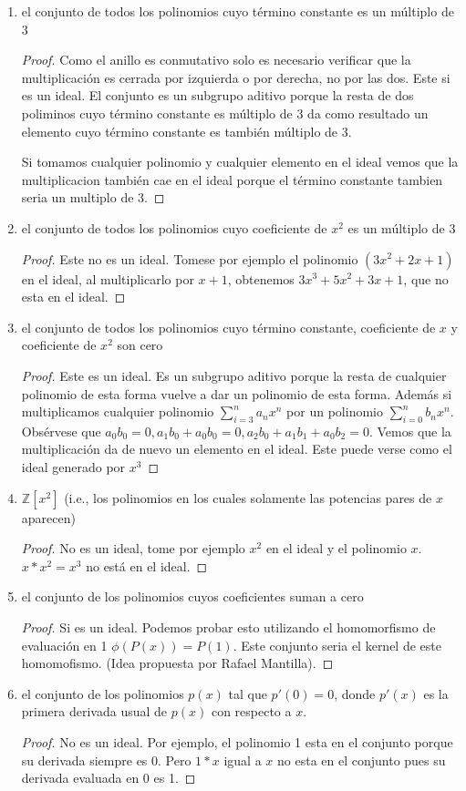 \documentclass[letter,twoside,12pt]{article}
\begin{document}
\begin{enumerate}[label=\textbf{(\alph*)}]
\item el conjunto de todos los polinomios cuyo t\'ermino constante es un m\'ultiplo de 3
\begin{proof}
Como el anillo es conmutativo solo es necesario verificar que la multiplicaci\'on es cerrada por izquierda o por derecha, no por las dos.
Este si es un ideal. El conjunto es un subgrupo aditivo porque la resta de dos poliminos cuyo t\'ermino constante es m\'ultiplo de 3 da como resultado un elemento cuyo t\'ermino constante es tambi\'en m\'ultiplo de 3.

Si tomamos cualquier polinomio y cualquier elemento en el ideal vemos que la multiplicacion tambi\'en cae en el ideal porque el t\'ermino constante tambien seria un multiplo de 3.
\end{proof}
\item el conjunto de todos los polinomios cuyo coeficiente de $x^2$ es un m\'ultiplo de 3
\begin{proof}
Este no es un ideal. Tomese por ejemplo el polinomio $(3x^2+2x+1)$ en el ideal, al multiplicarlo por $x+1$, obtenemos $3x^3+5x^2+3x+1$, que no esta en el ideal.
\end{proof}
\item el conjunto de todos los polinomios cuyo t\'ermino constante, coeficiente de $x$ y coeficiente de $x^2$ son cero
\begin{proof}
Este es un ideal. Es un subgrupo aditivo porque la resta de cualquier polinomio de esta forma vuelve a dar un polinomio de esta forma. Adem\'as si multiplicamos cualquier polinomio $\sum_{i=3}^n a_nx^n$ por un polinomio $\sum_{i=0}^n b_nx^n$. Obs\'ervese que $a_0b_0=0, a_1b_0+a_0b_0=0, a_2b_0+a_1b_1+a_0b_2=0$.
Vemos que la multiplicaci\'on da de nuevo un elemento en el ideal. Este puede verse como el ideal generado por $x^3$
\end{proof}
\item $\mathbb{Z}[x^2]$ (i.e., los polinomios en los cuales solamente las potencias pares de $x$ aparecen)
\begin{proof}
No es un ideal, tome por ejemplo $x^2$ en el ideal y el polinomio $x$. $x*x^2=x^3$ no est\'a en el ideal.
\end{proof}
\item el conjunto de los polinomios cuyos coeficientes suman a cero
\begin{proof}
Si es un ideal. Podemos probar esto utilizando el homomorfismo de evaluaci\'on en 1 $\phi(P(x))=P(1)$. Este conjunto seria el kernel de este homomofismo. (Idea propuesta por Rafael Mantilla).
\end{proof}
\item el conjunto de los polinomios $p(x)$ tal que $p'(0)=0$, donde $p'(x)$ es la primera derivada usual de $p(x)$ con respecto a $x$.
\begin{proof}
No es un ideal. Por ejemplo, el polinomio 1 esta en el conjunto porque su derivada siempre es 0. Pero $1*x$ igual a $x$ no esta en el conjunto pues su derivada evaluada en 0 es 1.
\end{proof}
\end{enumerate}
\end{document}
